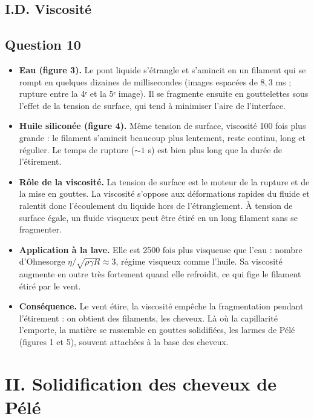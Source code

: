 \documentclass[11pt,a4paper]{article}
\providecommand{\tightlist}{\setlength{\itemsep}{0pt}\setlength{\parskip}{0pt}}
\begin{document}
\hypertarget{i.d.-viscosituxe9}{%
\subsection{I.D. Viscosité}\label{i.d.-viscosituxe9}}

\hypertarget{question-10}{%
\subsection{Question 10}\label{question-10}}

\begin{itemize}
\tightlist
\item
  \textbf{Eau (figure 3).} Le pont liquide s'étrangle et s'amincit en un filament qui se rompt en quelques dizaines de millisecondes (images espacées de \(8{,}3\) ms ; rupture entre la 4ᵉ et la 5ᵉ image). Il se fragmente ensuite en gouttelettes sous l'effet de la tension de surface, qui tend à minimiser l'aire de l'interface.
\item
  \textbf{Huile siliconée (figure 4).} Même tension de surface, viscosité 100 fois plus grande : le filament s'amincit beaucoup plus lentement, reste continu, long et régulier. Le temps de rupture (\(\sim 1\) s) est bien plus long que la durée de l'étirement.
\item
  \textbf{Rôle de la viscosité.} La tension de surface est le moteur de la rupture et de la mise en gouttes. La viscosité s'oppose aux déformations rapides du fluide et ralentit donc l'écoulement du liquide hors de l'étranglement. À tension de surface égale, un fluide visqueux peut être étiré en un long filament sans se fragmenter.
\item
  \textbf{Application à la lave.} Elle est 2500 fois plus visqueuse que l'eau : nombre d'Ohnesorge \(\eta/\sqrt{\rho\gamma R} \approx 3\), régime visqueux comme l'huile. Sa viscosité augmente en outre très fortement quand elle refroidit, ce qui fige le filament étiré par le vent.
\item
  \textbf{Conséquence.} Le vent étire, la viscosité empêche la fragmentation pendant l'étirement : on obtient des filaments, les cheveux. Là où la capillarité l'emporte, la matière se rassemble en gouttes solidifiées, les larmes de Pélé (figures 1 et 5), souvent attachées à la base des cheveux.
\end{itemize}

\hypertarget{ii.-solidification-des-cheveux-de-puxe9luxe9}{%
\section{II. Solidification des cheveux de Pélé}\label{ii.-solidification-des-cheveux-de-puxe9luxe9}}
\end{document}
